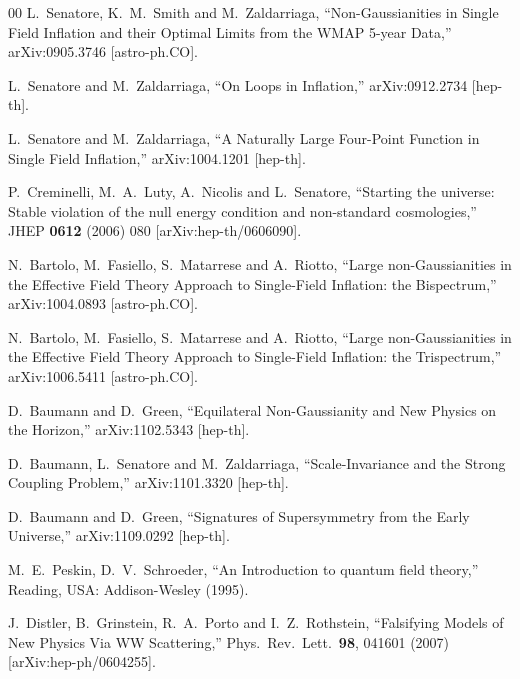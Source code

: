 \documentclass[11pt,amsmath,floats,floatfix,nofootinbib,secnumarabic, superscriptaddress, tightenlines]{revtex4}
\begin{document}
{\begin{thebibliography}{00}
  L.~Senatore, K.~M.~Smith and M.~Zaldarriaga,
  ``Non-Gaussianities in Single Field Inflation and their Optimal Limits from
  the WMAP 5-year Data,''
  arXiv:0905.3746 [astro-ph.CO].


  L.~Senatore and M.~Zaldarriaga,
  ``On Loops in Inflation,''
  arXiv:0912.2734 [hep-th].


  L.~Senatore and M.~Zaldarriaga,
  ``A Naturally Large Four-Point Function in Single Field Inflation,''
  arXiv:1004.1201 [hep-th].


  P.~Creminelli, M.~A.~Luty, A.~Nicolis and L.~Senatore,
  ``Starting the universe: Stable violation of the null energy condition and
  non-standard cosmologies,''
  JHEP {\bf 0612} (2006) 080
  [arXiv:hep-th/0606090].

  N.~Bartolo, M.~Fasiello, S.~Matarrese and A.~Riotto,
  ``Large non-Gaussianities in the Effective Field Theory Approach to
  Single-Field Inflation: the Bispectrum,''
  arXiv:1004.0893 [astro-ph.CO].

  N.~Bartolo, M.~Fasiello, S.~Matarrese and A.~Riotto,
  ``Large non-Gaussianities in the Effective Field Theory Approach to
  Single-Field Inflation: the Trispectrum,''
  arXiv:1006.5411 [astro-ph.CO].

  D.~Baumann and D.~Green,
  ``Equilateral Non-Gaussianity and New Physics on the Horizon,''
  arXiv:1102.5343 [hep-th].

   D.~Baumann, L.~Senatore and M.~Zaldarriaga,
  ``Scale-Invariance and the Strong Coupling Problem,''
  arXiv:1101.3320 [hep-th].

 D.~Baumann and D.~Green,
  ``Signatures of Supersymmetry from the Early Universe,''
  arXiv:1109.0292 [hep-th].

 M.~E.~Peskin, D.~V.~Schroeder, ``An Introduction to quantum field theory,''
  Reading, USA: Addison-Wesley (1995).

 J.~Distler, B.~Grinstein, R.~A.~Porto and I.~Z.~Rothstein,
  ``Falsifying Models of New Physics Via WW Scattering,''
  Phys.\ Rev.\ Lett.\  {\bf 98}, 041601 (2007)
  [arXiv:hep-ph/0604255].


\end{thebibliography}}
\end{document}
